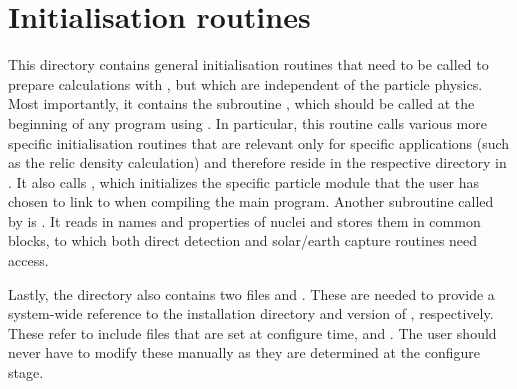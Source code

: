 \section{Initialisation routines}

This directory contains general initialisation routines that need to be called to prepare calculations with 
\ds, but which are independent of the particle physics. Most importantly, it contains the
subroutine , which should be called at the beginning of any program using
\ds. In particular, this routine calls various more specific initialisation routines that are relevant
only for specific applications (such as the relic density calculation) and therefore reside
in the respective directory in . It also calls , which initializes
the specific particle module that the user has chosen to link to when compiling the main program.
Another subroutine called by  is . It reads in names and properties 
of nuclei and stores them in common blocks, to which both direct detection and solar/earth capture
routines need access.

Lastly, the directory  also contains two files  and .
These are needed to provide a system-wide reference to the installation directory and version of
\ds, respectively. These refer to include files that are set at configure time,  and . The user should never have to modify these manually as they are determined at the configure stage.



